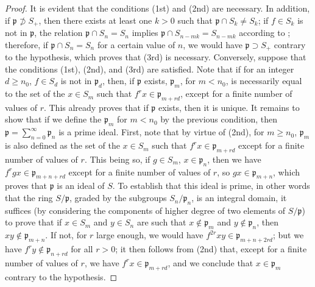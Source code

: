 \begin{proof}
It is evident that the conditions (1st) and (2nd) are necessary.
In addition, if $\mathfrak{p}\not\supset S_+$, then there exists at least one $k>0$ such that $\mathfrak{p}\cap S_k\neq S_k$;
if $f\in S_k$ is not in $\mathfrak{p}$, the relation $\mathfrak{p}\cap S_n=S_n$ implies $\mathfrak{p}\cap S_{n-mk}=S_{n-mk}$ according to ;
therefore, if $\mathfrak{p}\cap S_n=S_n$ for a certain value of $n$, we would have $\mathfrak{p}\supset S_+$ contrary to the hypothesis, which proves that (3rd) is necessary.
Conversely, suppose that the conditions (1st), (2nd), and (3rd) are satisfied.
Note that if for an integer $d\geq n_0$, $f\in S_d$ is not in $\mathfrak{p}_d$, then, if $\mathfrak{p}$ exists, $\mathfrak{p}_m$, for $m<n_0$, is necessarily equal to the set of the $x\in S_m$ such that $f^r x\in\mathfrak{p}_{m+rd}$, except for a finite number of values of $r$.
This already proves that if $\mathfrak{p}$ exists, then it is unique.
It remains to show that if we define the $\mathfrak{p}_m$ for $m<n_0$ by the previous condition, then $\mathfrak{p}=\sum_{n=0}^\infty\mathfrak{p}_n$ is a prime ideal.
First, note that by virtue of (2nd), for $m\geq n_0$, $\mathfrak{p}_m$ is also defined as the set of the $x\in S_m$ such that $f^r x\in\mathfrak{p}_{m+rd}$ except for a finite number of values of $r$.
This
being so, if $g\in S_m$, $x\in\mathfrak{p}_n$, then we have $f^r gx\in\mathfrak{p}_{m+n+rd}$ except for a finite number of values of $r$, so $gx\in\mathfrak{p}_{m+n}$, which proves that $\mathfrak{p}$ is an ideal of $S$.
To establish that this ideal is prime, in other words that the ring $S/\mathfrak{p}$, graded by the subgroups $S_n/\mathfrak{p}_n$, is an integral domain, it suffices (by considering the components of higher degree of two elements of $S/\mathfrak{p}$) to prove that if $x\in S_m$ and $y\in S_n$ are such that $x\not\in\mathfrak{p}_m$ and $y\not\in\mathfrak{p}_n$, then $xy\not\in\mathfrak{p}_{m+n}$.
If not, for $r$ large enough, we would have $f^{2r}xy\in\mathfrak{p}_{m+n+2rd}$;
but we have $f^r y\not\in\mathfrak{p}_{n+rd}$ for all $r>0$;
it then follows from (2nd) that, except for a finite number of values of $r$, we have $f^r x\in\mathfrak{p}_{m+rd}$, and we conclude that $x\in\mathfrak{p}_m$ contrary to the hypothesis.
\end{proof}

